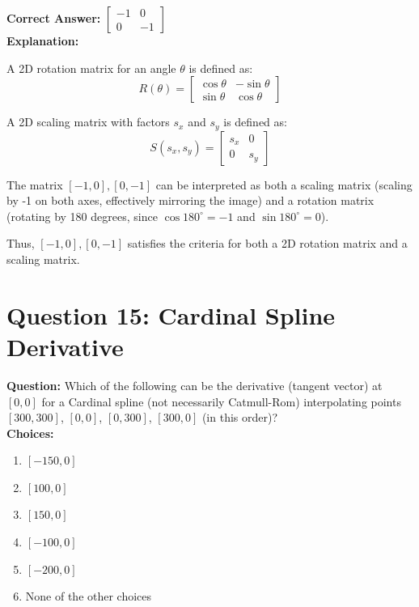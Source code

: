 \documentclass[notitlepage]{llncs}
\begin{document}
\textbf{Correct Answer:} $\begin{bmatrix}
                            -1 & 0 \\
                            0 & -1
                            \end{bmatrix}$
\\

\textbf{Explanation:}

A 2D rotation matrix for an angle $\theta$ is defined as:
\[ R(\theta) = \begin{bmatrix} \cos\theta & -\sin\theta \\ \sin\theta & \cos\theta \end{bmatrix} \]

A 2D scaling matrix with factors $s_x$ and $s_y$ is defined as:
\[ S(s_x, s_y) = \begin{bmatrix} s_x & 0 \\ 0 & s_y \end{bmatrix} \]

The matrix \([-1, 0], [0, -1]\) can be interpreted as both a scaling matrix (scaling by -1 on both axes, effectively mirroring the image) and a rotation matrix (rotating by 180 degrees, since $\cos180^\circ = -1$ and $\sin180^\circ = 0$).

Thus, \([-1, 0], [0, -1]\) satisfies the criteria for both a 2D rotation matrix and a scaling matrix.

\newpage
\section*{Question 15: Cardinal Spline Derivative}
\textbf{Question:} Which of the following can be the derivative (tangent vector) at \([0, 0]\) for a Cardinal spline (not necessarily Catmull-Rom) interpolating points \([300, 300]\), \([0, 0]\), \([0, 300]\), \([300, 0]\) (in this order)?
\\

\textbf{Choices:}
\begin{enumerate}
\renewcommand{\labelenumi}{\Alph{enumi}.} 
    \item \([-150,0]\)
    \item \([100,0]\)
    \item \([150,0]\)
    \item \([-100,0]\)
    \item \([-200,0]\)
    \item None of the other choices
\end{enumerate}
\end{document}
